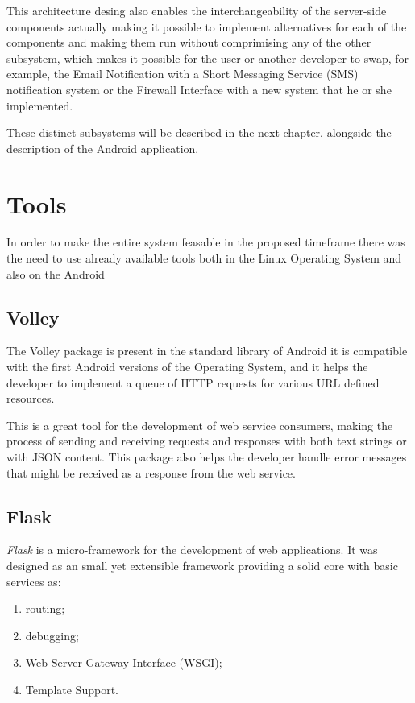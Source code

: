 This architecture desing also enables the interchangeability of the server-side
components actually making it possible to implement alternatives for each of the
components and making them run without comprimising any of the other subsystem,
which makes it possible for the user or another developer to swap, for example,
the Email Notification with a Short Messaging Service (SMS) notification system
or the Firewall Interface with a new system that he or she implemented.

These distinct subsystems will be described in the next chapter, alongside the
description of the Android application.


\section{Tools}
\label{chap3:sec:tools}
In order to make the entire system feasable in the proposed timeframe there was
the need to use already available tools both in the Linux Operating System and
also on the Android

\subsection{Volley}
\label{chap3:sec:tools:sub:volley}
The Volley package is present in the standard library of Android it is
compatible with the first Android versions of the Operating System, and it helps
the developer to implement a queue of HTTP requests for various URL defined
resources.

This is a great tool for the development of web service consumers, making the
process of sending and receiving requests and responses with both text strings
or with JSON content. This package also helps the developer handle error
messages that might be received as a response from the web service.

\subsection{Flask}
\label{chap3:sec:tools:sub:flask}
\emph{Flask} is a micro-framework for the development of web applications. It
was designed as an small yet extensible framework providing a solid core with
basic services as:
\begin{enumerate}
	\item routing;
	\item debugging;
	\item Web Server Gateway Interface (WSGI);
	\item Template Support.
\end{enumerate}

